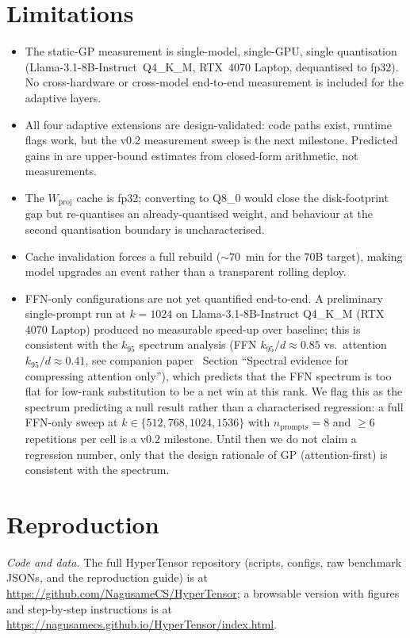 \documentclass[11pt]{article}
\begin{document}
\section{Limitations}
\label{sec:limitations}
\label{sec:limits}
\begin{itemize}
\item The static-GP measurement is single-model, single-GPU, single
quantisation (Llama-3.1-8B-Instruct~Q4\_K\_M, RTX~4070 Laptop, dequantised
to fp32).  No cross-hardware or cross-model end-to-end measurement is
included for the adaptive layers.
\item All four adaptive extensions are design-validated: code paths
exist, runtime flags work, but the v0.2 measurement sweep is the next
milestone.  Predicted gains in 
are upper-bound estimates from closed-form arithmetic, not measurements.
\item The $W_\text{proj}$ cache is fp32; converting to Q8\_0
\cite{ggerganov2023kquants} would close the disk-footprint gap but
re-quantises an already-quantised weight, and behaviour at the second
quantisation boundary is uncharacterised.
\item Cache invalidation forces a full rebuild ($\sim 70$~min for the 70B
target), making model upgrades an event rather than a transparent rolling
deploy.
\item FFN-only configurations are not yet quantified end-to-end.
A preliminary single-prompt run at $k{=}1024$ on Llama-3.1-8B-Instruct
Q4\_K\_M (RTX 4070 Laptop) produced no measurable speed-up over
baseline; this is consistent with the $k_{95}$ spectrum analysis (FFN
$k_{95}/d{\approx}0.85$ vs.\ attention $k_{95}/d{\approx}0.41$, see
companion paper~\cite{stewart2026grc} Section ``Spectral evidence for
compressing attention only''), which predicts that the FFN spectrum is
too flat for low-rank substitution to be a net win at this rank. We
flag this as the spectrum predicting a null result rather than a
characterised regression: a full FFN-only sweep at
$k\in\{512, 768, 1024, 1536\}$ with $n_\text{prompts}{=}8$ and
$\geq 6$ repetitions per cell is a v0.2 milestone. Until then we do
not claim a regression number, only that the design rationale of GP
(attention-first) is consistent with the spectrum.
\end{itemize}

\section{Reproduction}
\smallskip\noindent\textit{Code and data.} The full HyperTensor repository (scripts, configs, raw benchmark JSONs, and the reproduction guide) is at \url{https://github.com/NagusameCS/HyperTensor}; a browsable version with figures and step-by-step instructions is at \url{https://nagusamecs.github.io/HyperTensor/index.html}.
\end{document}
